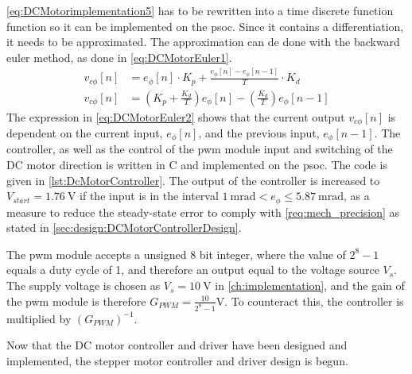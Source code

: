 \autoref{eq:DCMotorimplementation5} has to be rewritten into a time discrete function function so it can be implemented on the \gls{psoc}. Since it contains a differentiation, it needs to be approximated. The approximation can de done with the backward euler method, as done in \autoref{eq:DCMotorEuler1}. 
\begin{subequations}
\begin{align} 
v_{c \phi} [n] &= e_{\phi} [n] \cdot K_p + \frac{ e_{\phi} [n] - e_{\phi} [n-1]}{T} \cdot K_d \label{eq:DCMotorEuler1} \\
v_{c \phi} [n] &= \left( K_p + \frac{K_d}{T}\right) e_{\phi} [n]  - \left(\frac{K_d}{T}\right) e_{\phi} [n-1] \label{eq:DCMotorEuler2}
\end{align}
\end{subequations}
\startexplain
{}
\stopexplain
The expression in \autoref{eq:DCMotorEuler2} shows that the current output $v_{c\phi} [n]$ is dependent on the current input, $e_\phi [n]$, and the previous input, $e_\phi [n-1]$. The controller, as well as the control of the \gls{pwm} module input and switching of the DC motor direction is written in C and implemented on the \gls{psoc}. The code is given in \autoref{lst:DcMotorController}. The output of the controller is increased to $V_{start} = \SI{1.76}{\volt}$ if the input is in the interval $\SI{1}{\milli\radian} < e_\phi \leq \SI{5.87}{\milli\radian}$, as a measure to reduce the steady-state error to comply with \autoref{req:mech_precision} as stated in \autoref{sec:design:DCMotorControllerDesign}.

The \gls{pwm} module accepts a unsigned 8 bit integer, where the value of $2^{8}-1$ equals a duty cycle of 1, and therefore an output equal to the voltage source $V_s$. The supply voltage is chosen as $V_s = \SI{10}{\volt}$ in \autoref{ch:implementation}, and the gain of the \gls{pwm} module is therefore $G_{PWM} = \frac{10}{2^{8}-1} \si{\volt}$. To counteract this, the controller is multiplied by $\left(G_{PWM}\right)^{-1}$.

\begin{figure}[p]
	
\end{figure}

Now that the DC motor controller and driver have been designed and implemented, the stepper motor controller and driver design is begun.
